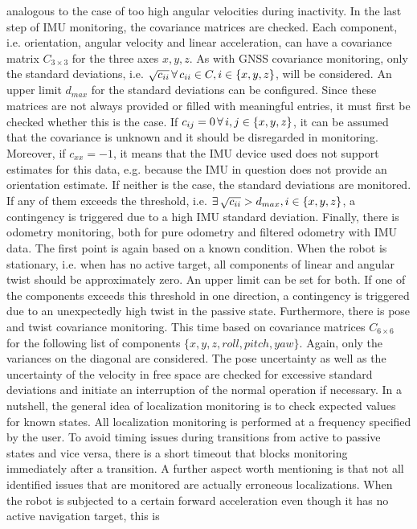 \documentclass[english, master, utf8]{base/thesis_KBS}
\newcommand{\code}{\collectverb{\codebox}}
\begin{document}
analogous to the case of too high angular velocities during inactivity. In the last step of IMU monitoring, the covariance matrices are checked. Each component, i.e. orientation, angular
velocity and linear acceleration, can have a covariance matrix $C_{3 \times 3}$ for the three axes $x, y, z$. As with GNSS covariance monitoring, only the standard deviations, i.e.
$\sqrt{c_{ii}} \thinspace \forall \thinspace c_{ii} \in C, i \in \{x, y, z\}$, will be considered. An upper limit $d_{max}$ for the standard deviations can be configured. Since these matrices are
not always provided or filled with meaningful entries, it must first be checked whether this is the case. If $c_{ij} = 0 \thinspace \forall \thinspace i, j \in \{x, y, z\}$,
it can be assumed that the covariance is unknown and it should be disregarded in monitoring. Moreover, if $c_{xx} = -1$, it means that the IMU device used does not support estimates
for this data, e.g. because the IMU in question does not provide an orientation estimate. If neither is the case, the standard deviations are monitored.  If any
of them exceeds the threshold, i.e. $\exists \thinspace \sqrt{c_{ii}} > d_{max}, i \in \{x, y, z\}$, a contingency is triggered due to a high IMU standard deviation. Finally, there is odometry monitoring, both for pure
odometry and filtered odometry with IMU data. The first point is again based on a known condition. When the robot is stationary, i.e. when \code{move_base_flex} has no active target,
all components of linear and angular twist should be approximately zero. An upper limit can be set for both. If one of the components exceeds this threshold in one direction, a
contingency is triggered due to an unexpectedly high twist in the passive state. Furthermore, there is pose and twist covariance monitoring. This time based on
covariance matrices $C_{6 \times 6}$ for the following list of components $\{x, y, z, roll, pitch, yaw\}$. Again, only the variances on the diagonal are considered. The pose uncertainty as well as the uncertainty of the velocity
in free space are checked for excessive standard deviations and initiate an interruption of the normal operation if necessary. In a nutshell, the general idea of localization
monitoring is to check expected values for known states. All localization monitoring is performed at a frequency specified by the user. To avoid timing issues during transitions from
active to passive states and vice versa, there is a short timeout that blocks monitoring immediately after a transition. A further aspect worth mentioning is that not all identified
issues that are monitored are actually erroneous localizations. When the robot is subjected to a certain forward acceleration even though it has no active navigation target, this is
\end{document}
